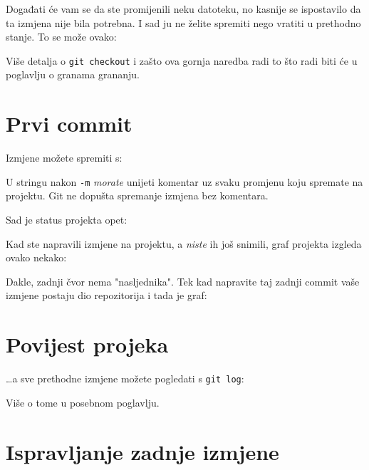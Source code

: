 
Događati će vam se da ste promijenili neku datoteku, no kasnije se ispostavilo da ta izmjena nije bila potrebna. 
I sad ju ne želite spremiti nego vratiti u prethodno stanje.
To se može ovako:


Više detalja o \verb+git checkout+ i zašto ova gornja naredba radi to što radi biti će u poglavlju o granama grananju.

\section*{Prvi commit}

Izmjene možete spremiti s:


U stringu nakon \verb+-m+ \emph{morate} unijeti komentar uz svaku promjenu koju spremate na projektu.
Git ne dopušta spremanje izmjena bez komentara.

Sad je status projekta opet:



Kad ste napravili izmjene na projektu, a \emph{niste} ih još snimili, graf projekta izgleda ovako nekako:



Dakle, zadnji čvor nema "nasljednika".
Tek kad napravite taj zadnji commit vaše izmjene postaju dio repozitorija i tada je graf:



\section*{Povijest projeka}

\dots{}a sve prethodne izmjene možete pogledati s \verb+git log+:



Više o tome u posebnom poglavlju.

\section*{Ispravljanje zadnje izmjene}

